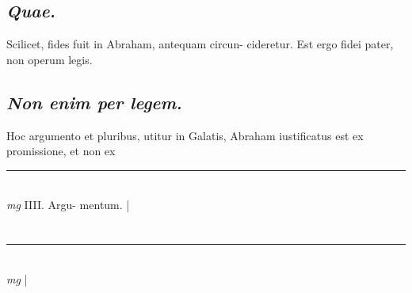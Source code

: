 \documentclass{article}
\begin{document}
\begin{pages}
\subsection*{\textit{Quae. }}\pstart Scilicet, fides fuit in Abraham, antequam circun- cideretur. Est ergo fidei pater, non operum legis.   \pend
{}
{}
\subsection*{\textit{Non enim per legem. }}\pstart Hoc argumento et pluribus, utitur in Galatis, Abraham iustificatus est ex promissione, et non ex  \pend
\vspace{0.5cm}\noindent
\vspace{0.2cm}\rule{1cm}{0.2pt}\\ 
\hspace{0.2cm}\textit{mg}
\footnotesize IIII. Argu- mentum.  
\normalsize| 
\section*{ }\pstart                              \pend
\vspace{0.5cm}\noindent
\vspace{0.2cm}\rule{1cm}{0.2pt}\\ 
\hspace{0.2cm}\textit{mg}
\footnotesize 
\normalsize| 
\section*{  }
\marginpar{[ p.]}
{}
\subsection*{\textit{ }}\pstart    \pend
{}
{}
\subsection*{\textit{ }}\pstart    \pend
{}
{}
\subsection*{\textit{ }}\pstart              \pend
{}
{}
\subsection*{\textit{ }}\pstart   \pend
{}
{}

\end{pages}
\end{document}
